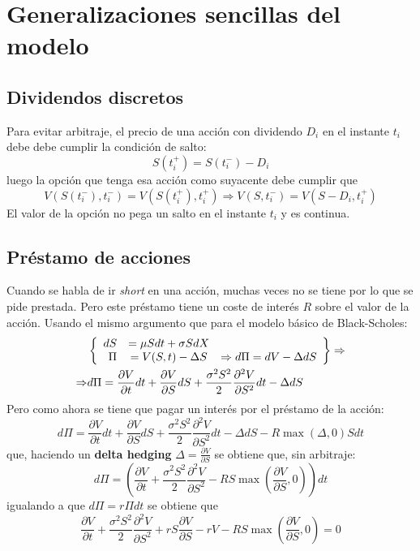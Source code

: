 
\section{Generalizaciones sencillas del modelo}

\subsection{Dividendos discretos}
Para evitar arbitraje, el precio de una acción con dividendo $D_i$ en el instante $t_i$ debe debe cumplir la condición de salto:
\[
    S(t_i^+) = S(t_i^-) - D_i
\]
luego la opción que tenga esa acción como suyacente debe cumplir que
\[
    V(S(t_i^-), t_i^-) = V(S(t_i^+), t_i^+) \Rightarrow \boxed{V(S, t_i^-) = V(S - D_i, t_i^+)}
\]\label{eq:divs_discretos}
El valor de la opción no pega un salto en el instante $t_i$ y es continua.




\subsection{Préstamo de acciones}
Cuando se habla de ir \textit{short} en una acción, muchas veces no se tiene por lo que se pide prestada. Pero este préstamo tiene un coste de interés $R$ sobre el valor de la acción. Usando el mismo argumento que para el modelo básico de Black-Scholes:
\begin{align*}
    &\left\{ 
        \begin{array}{rcl} 
            dS &= \mu Sdt + \sigma S d\mathnormal{X} &\\ 
            \Pi &= V(S,t) - \Delta S &\Rightarrow d\Pi = dV- \Delta dS
        \end{array} 
    \right\} \Rightarrow \\
    \Rightarrow &d\Pi = \frac{\partial V}{\partial t}dt + \frac{\partial V}{\partial S}dS + \frac{\sigma^2S^2}{2} \frac{\partial^2 V}{\partial S^2}dt - \Delta dS
\end{align*}
Pero como ahora se tiene que pagar un interés por el préstamo de la acción:
\[
    d\Pi = \frac{\partial V}{\partial t}dt + \frac{\partial V}{\partial S}dS + \frac{\sigma^2S^2}{2} \frac{\partial^2 V}{\partial S^2}dt - \Delta dS - R\max(\Delta, 0)Sdt
\]
que, haciendo un \textbf{delta hedging} $\Delta = \frac{\partial V}{\partial S}$ se obtiene que, sin arbitraje:
\[
d\Pi = \left( \frac{\partial V}{\partial t} + \frac{\sigma^2S^2}{2} \frac{\partial^2 V}{\partial S^2} -RS\max\left(\frac{\partial V}{\partial S}, 0\right) \right)dt
\]
igualando a que $d\Pi = r\Pi dt$ se obtiene que
\[
\boxed{\frac{\partial V}{\partial t} + \frac{\sigma^2S^2}{2} \frac{\partial^2 V}{\partial S^2} + rS \frac{\partial V}{\partial S} -rV -RS\max\left(\frac{\partial V}{\partial S}, 0\right) = 0}
\]


